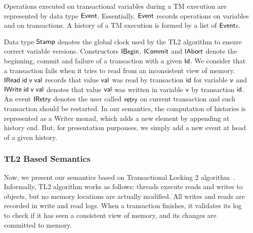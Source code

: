 \documentclass[sigplan]{acmart}
\def\resethooks{%
  \global\let\SaveRestoreHook\empty
  \global\let\ColumnHook\empty}
\newlength{\blanklineskip}
\newcommand{\hsindent}[1]{\quad}%
\let\hspre\empty
\let\hspost\empty
\theoremstyle{definition}
\newcommand{\D}[1]{\blue{\mathsf{#1}}}
\newcommand{\C}[1]{\red{\mathsf{#1}}}
\newcommand{\F}[1]{\green{\mathsf{#1}}}
\newcommand{\V}[1]{\black{\mathsf{#1}}}
\begin{document}
Operations executed on transactional variables during a TM
execution are represented by data type \ensuremath{\D{Event}}. Essentially,
\ensuremath{\D{Event}} records operations on variables and on transactions.
A history of a TM execution is formed by a list of \ensuremath{\D{Event}}s.
\resethooks
Data type \ensuremath{\D{Stamp}} denotes the global clock used by the TL2 algorithm to ensure correct variable versions.
Constructors \ensuremath{\C{IBegin}}, \ensuremath{\C{ICommit}} and \ensuremath{\C{IAbort}} denote the beginning, commit and failure of
a transaction with a given \ensuremath{\D{Id}}. We consider that a transaction fails
when it tries to read from an inconsistent view of memory. \ensuremath{\C{IRead}\;\V{id}\;\V{v}\;\V{val}} records that
value \ensuremath{\V{val}} was read by transaction \ensuremath{\V{id}} for variable \ensuremath{\V{v}} and \ensuremath{\C{IWrite}\;\V{id}\;\V{v}\;\V{val}}
denotes that value \ensuremath{\V{val}} was written in variable \ensuremath{\V{v}} by transaction \ensuremath{\V{id}}.
An event \ensuremath{\C{IRetry}} denotes the user called \ensuremath{\F{retry}} on current transaction and such
transaction should be restarted. In our semantics, the computation of histories is represented
as a Writer monad, which adds a new element by appending at history end. But, for presentation
purpouses, we simply add a new event at head of a given history.

\subsubsection{TL2 Based Semantics}

Now, we present our semantics based on Transactional Locking 2 
algorithm~\cite{Dice06}. Informally, TL2 algorithm works as follows:
threads execute reads and writes to objects, but no memory locations are actually modified. All 
writes and reads are recorded in write and read logs. When a
transaction finishes, it validates its log to check if it has seen a 
consistent view of memory, and its changes are committed to memory.
\end{document}

